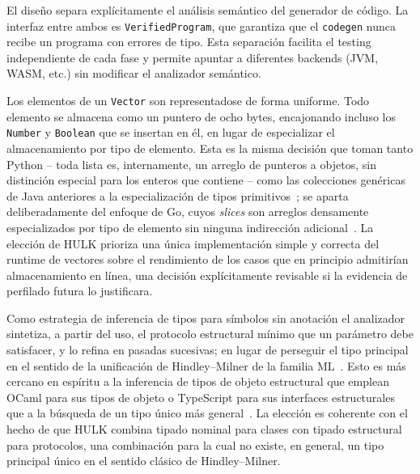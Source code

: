 \documentclass[12pt, a4paper]{article}
\begin{document}
El dise\~{n}o separa expl\'{i}citamente el an\'{a}lisis sem\'{a}ntico del generador de
c\'{o}digo. La interfaz entre ambos es \texttt{VerifiedProgram}, que garantiza
que el \texttt{codegen} nunca recibe un programa con errores de tipo. Esta separaci\'{o}n
facilita el testing independiente de cada fase y permite apuntar a diferentes
backends (JVM, WASM, etc.) sin modificar el analizador sem\'{a}ntico.

Los elementos de un \texttt{Vector} son representadose de forma uniforme. Todo elemento se almacena como un puntero de ocho bytes,
encajonando incluso los \texttt{Number} y \texttt{Boolean} que se insertan en
\'{e}l, en lugar de especializar el almacenamiento por tipo de elemento. Esta es
la misma decisi\'{o}n que toman tanto Python -- toda lista es, internamente, un
arreglo de punteros a objetos, sin distinci\'{o}n especial para los enteros que
contiene -- como las colecciones gen\'{e}ricas de Java anteriores a la
especializaci\'{o}n de tipos primitivos~\cite{gosling2021}; se aparta
deliberadamente del enfoque de Go, cuyos \textit{slices} son arreglos
densamente especializados por tipo de elemento sin ninguna indirecci\'{o}n
adicional~\cite{donovan2015}. La elecci\'{o}n de HULK prioriza una \'{u}nica
implementaci\'{o}n simple y correcta del runtime de vectores sobre el
rendimiento de los casos que en principio admitir\'{i}an almacenamiento en
l\'{i}nea, una decisi\'{o}n expl\'{i}citamente revisable si la evidencia de
perfilado futura lo justificara.

Como estrategia de inferencia de tipos para símbolos sin
anotaci\'{o}n el analizador sintetiza, a partir del uso, el protocolo estructural m\'{i}nimo
que un par\'{a}metro debe satisfacer, y lo refina en pasadas sucesivas; en lugar de perseguir el tipo principal en el sentido de la
unificaci\'{o}n de Hindley--Milner de la familia ML~\cite{milner1978}.  Esto es
m\'{a}s cercano en esp\'{i}ritu a la inferencia de tipos de objeto estructural
que emplean OCaml para sus tipos de objeto o TypeScript para sus interfaces
estructurales~\cite{leroy2023,bierman2014} que a la b\'{u}squeda de un tipo
\'{u}nico m\'{a}s general~\cite{pierce2002,cardelli1985}. La elecci\'{o}n es
coherente con el hecho de que HULK combina tipado nominal para clases con
tipado estructural para protocolos, una combinaci\'{o}n para la cual no existe,
en general, un tipo principal \'{u}nico en el sentido cl\'{a}sico de
Hindley--Milner.

\newpage

\end{document}
